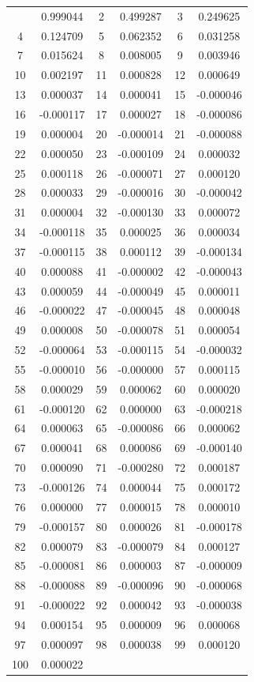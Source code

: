 \documentclass[12pt]{article}
\begin{document}
\begin{longtable}{@{}cc|cc|cc@{}}
\bottomrule
\endlastfoot
1 & 0.999044 & 2 & 0.499287 & 3 & 0.249625 \\
4 & 0.124709 & 5 & 0.062352 & 6 & 0.031258 \\
7 & 0.015624 & 8 & 0.008005 & 9 & 0.003946 \\
10 & 0.002197 & 11 & 0.000828 & 12 & 0.000649 \\
13 & 0.000037 & 14 & 0.000041 & 15 & -0.000046 \\
16 & -0.000117 & 17 & 0.000027 & 18 & -0.000086 \\
19 & 0.000004 & 20 & -0.000014 & 21 & -0.000088 \\
22 & 0.000050 & 23 & -0.000109 & 24 & 0.000032 \\
25 & 0.000118 & 26 & -0.000071 & 27 & 0.000120 \\
28 & 0.000033 & 29 & -0.000016 & 30 & -0.000042 \\
31 & 0.000004 & 32 & -0.000130 & 33 & 0.000072 \\
34 & -0.000118 & 35 & 0.000025 & 36 & 0.000034 \\
37 & -0.000115 & 38 & 0.000112 & 39 & -0.000134 \\
40 & 0.000088 & 41 & -0.000002 & 42 & -0.000043 \\
43 & 0.000059 & 44 & -0.000049 & 45 & 0.000011 \\
46 & -0.000022 & 47 & -0.000045 & 48 & 0.000048 \\
49 & 0.000008 & 50 & -0.000078 & 51 & 0.000054 \\
52 & -0.000064 & 53 & -0.000115 & 54 & -0.000032 \\
55 & -0.000010 & 56 & -0.000000 & 57 & 0.000115 \\
58 & 0.000029 & 59 & 0.000062 & 60 & 0.000020 \\
61 & -0.000120 & 62 & 0.000000 & 63 & -0.000218 \\
64 & 0.000063 & 65 & -0.000086 & 66 & 0.000062 \\
67 & 0.000041 & 68 & 0.000086 & 69 & -0.000140 \\
70 & 0.000090 & 71 & -0.000280 & 72 & 0.000187 \\
73 & -0.000126 & 74 & 0.000044 & 75 & 0.000172 \\
76 & 0.000000 & 77 & 0.000015 & 78 & 0.000010 \\
79 & -0.000157 & 80 & 0.000026 & 81 & -0.000178 \\
82 & 0.000079 & 83 & -0.000079 & 84 & 0.000127 \\
85 & -0.000081 & 86 & 0.000003 & 87 & -0.000009 \\
88 & -0.000088 & 89 & -0.000096 & 90 & -0.000068 \\
91 & -0.000022 & 92 & 0.000042 & 93 & -0.000038 \\
94 & 0.000154 & 95 & 0.000009 & 96 & 0.000068 \\
97 & 0.000097 & 98 & 0.000038 & 99 & 0.000120 \\
100 & 0.000022 &  &  &  &  \\

\end{longtable}
\end{document}
